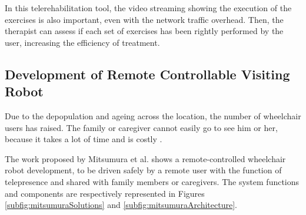 In this telerehabilitation tool, the video streaming showing the execution of the exercises is also important, even with the network traffic overhead. Then, the therapist can assess if each set of exercises has been rightly  performed by the user, increasing the efficiency of treatment. 


\subsection{Development of Remote Controllable Visiting Robot}
\label{subsec:mitsumura2014}

Due to the depopulation and ageing across the location, the number of wheelchair users has raised. The family or caregiver cannot  easily go to see him or her, because it takes a lot of time and is costly \cite{mitsumura2014}. 

The work proposed by Mitsumura et al. \cite{mitsumura2014} shows a remote-controlled wheelchair robot development, to be driven safely by a remote user with the function of telepresence and shared with family members or caregivers. The system functions and components are respectively represented in Figures \ref{subfig:mitsumuraSolutions} and \ref{subfig:mitsumuraArchitecture}. 

